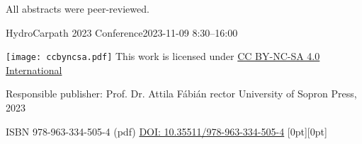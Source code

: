 \vspace*{\fill}
\noindent{}All abstracts were peer-reviewed.
\vspace*{10mm}

\footnotesize{}
\noindent{}HydroCarpath 2023 Conference\newline{}2023-11-09 8:30–16:00
\vspace*{5mm}

\noindent{}\texttt{[image: ccbyncsa.pdf]}\newline{}
This work is licensed under \href{https://creativecommons.org/licenses/by-nc-nd/4.0/deed.en}{CC BY-NC-SA 4.0 International}

\noindent{}Responsible publisher: Prof. Dr. Attila Fábián rector \newline{} University of Sopron Press, 2023

\noindent ISBN 978-963-334-505-4 (pdf)\newline{}
\noindent \href{https://doi.org/10.35511/978-963-334-505-4}{DOI: 10.35511/978-963-334-505-4}
\hspace*{\fill} \hspace{1mm} \raisebox{0mm}[0pt][0pt]{}
\normalsize{}

\setcounter{page}{2}
\cleardoublepage{}
\fancyhead[LE,RO]{\thepage}

\setcounter{secnumdepth}{0}%
{}
\tableofcontents{}
\newpage{}
{}

\setcounter{articleid}{0}
{}


{}
\printindex

{}
\appendix
{}


